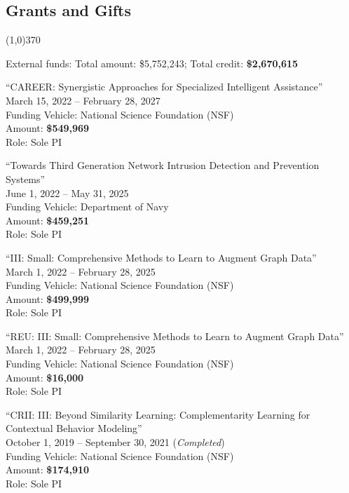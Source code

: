 \documentclass[10pt]{article}
\newenvironment{myindentpar}[1]%
{\begin{list}{}%
         {\setlength{\leftmargin}{#1}}%
         \item[]%
}
{\end{list}}
\newcounter{list}
\begin{document}
\subsection{\sc Grants and Gifts}
\vspace{-0.4cm} \line(1,0){370} \vspace{-0.1cm}

\begin{myindentpar}{0.75cm}

\hspace{-0.75cm}External funds: Total amount: \$5,752,243; Total credit: \textbf{\$2,670,615}

\hspace{-0.75cm}``CAREER: Synergistic Approaches for Specialized Intelligent Assistance'' \\
March 15, 2022 -- February 28, 2027 \\
Funding Vehicle: National Science Foundation (NSF) \\
Amount: \textbf{\$549,969} \\
Role: {Sole PI}

\hspace{-0.75cm}``Towards Third Generation Network Intrusion Detection and Prevention Systems'' \\
June 1, 2022 -- May 31, 2025 \\
Funding Vehicle: Department of Navy \\
Amount: \textbf{\$459,251} \\
Role: {Sole PI}

\hspace{-0.75cm}``III: Small: Comprehensive Methods to Learn to Augment Graph Data'' \\
March 1, 2022 -- February 28, 2025 \\
Funding Vehicle: National Science Foundation (NSF) \\
Amount: \textbf{\$499,999} \\
Role: {Sole PI}

\hspace{-0.75cm}``REU: III: Small: Comprehensive Methods to Learn to Augment Graph Data'' \\
March 1, 2022 -- February 28, 2025 \\
Funding Vehicle: National Science Foundation (NSF) \\
Amount: \textbf{\$16,000} \\
Role: {Sole PI}

\hspace{-0.75cm}``CRII: III: Beyond Similarity Learning: Complementarity Learning for Contextual Behavior Modeling'' \\
October 1, 2019 -- September 30, 2021 (\emph{Completed}) \\
Funding Vehicle: National Science Foundation (NSF) \\
Amount: \textbf{\$174,910} \\
Role: {Sole PI}


\end{myindentpar}
\end{document}
